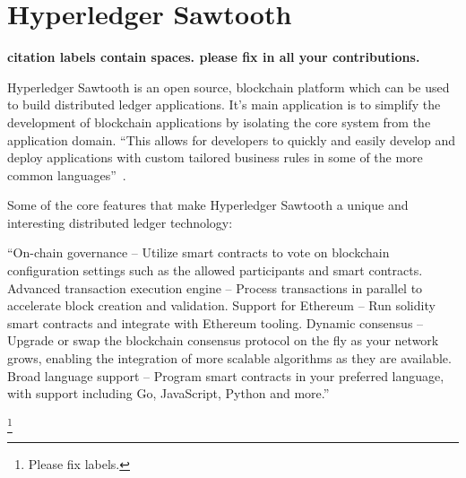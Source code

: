 \section{Hyperledger Sawtooth}


{\bf citation labels contain spaces. please fix in all your contributions.}

Hyperledger Sawtooth is an open source, blockchain platform which can
be used to build distributed ledger applications. It’s main
application is to simplify the development of blockchain applications
by isolating the core system from the application domain. ``This
allows for developers to quickly and easily develop and deploy
applications with custom tailored business rules in some of the more
common languages''~\cite{Hyperledger Sawtooth}.

Some of the core features that make Hyperledger Sawtooth a unique and
interesting distributed ledger technology:
  
``On-chain governance – Utilize smart contracts to vote on blockchain
configuration settings such as the allowed participants and smart
contracts.  Advanced transaction execution engine – Process
transactions in parallel to accelerate block creation and validation.
Support for Ethereum – Run solidity smart contracts and integrate with
Ethereum tooling.  Dynamic consensus – Upgrade or swap the blockchain
consensus protocol on the fly as your network grows, enabling the
integration of more scalable algorithms as they are available.  Broad
language support – Program smart contracts in your preferred language,
with support including Go, JavaScript, Python and 
more.''~\cite{Linux Foundation Sawtooth}

\footnote{Please fix labels.}